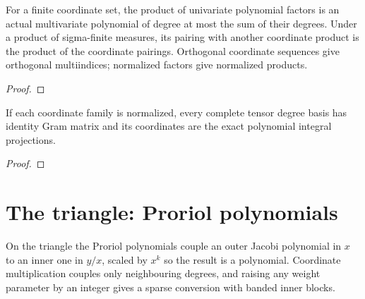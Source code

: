 \begin{supporting}
\begin{theorem}
\label{thm:tensor-product-pairings}
\leanok
For a finite coordinate set, the product of univariate polynomial factors is an actual multivariate polynomial of degree at most the sum of their degrees. Under a product of sigma-finite measures, its pairing with another coordinate product is the product of the coordinate pairings. Orthogonal coordinate sequences give orthogonal multiindices; normalized factors give normalized products.
\end{theorem}
\begin{proof}
\leanok
\end{proof}

\begin{theorem}
\label{thm:tensor-product-coordinates}
\leanok
If each coordinate family is normalized, every complete tensor degree basis has identity Gram matrix and its coordinates are the exact polynomial integral projections.
\end{theorem}
\begin{proof}
\leanok
\end{proof}

\end{supporting}

\section{The triangle: Proriol polynomials}\label{sec:triangle}

On the triangle the Proriol polynomials couple an outer Jacobi
polynomial in $x$ to an inner one in $y/x$, scaled by $x^k$ so the result is a
polynomial. Coordinate multiplication couples only neighbouring degrees, and
raising any weight parameter by an integer gives a sparse conversion with banded
inner blocks.

